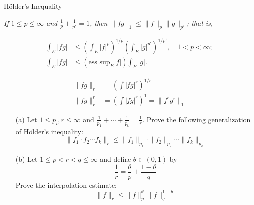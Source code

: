 \documentclass[UTF8,a4paper,10pt]{article}
\begin{document}
\begin{mybox}{H\"older's Inequality}

    \textit{If $1 \leq p \leq \infty$ and $\frac{1}{p} + \frac{1}{p'} = 1$, then $\|fg\|_1 \leq \|f\|_p \|g\|_{p'}$; that is,}

    \begin{equation*}
        \begin{aligned}
          \int_E |fg| &\leq \left( \int_E |f|^p \right)^{1/p} \left( \int_E |g|^{p'} \right)^{1/p'}, \quad 1 < p < \infty; \\
          \int_E |fg| &\leq \left( \text{ess sup}_E |f| \right) \int_E |g|.
        \end{aligned}
      \end{equation*} 
      
    

\end{mybox}


\begin{equation*}
    \begin{aligned}
        \|fg\|_r &= \left( \int |fg|^r \right)^{1/r}\\
        \|f g\|_r^r &= \left( \int |fg|^r \right)^{1} = \|f^r g^r\|_1
    \end{aligned}
  \end{equation*}        


\begin{Problem}[]{}
    \begin{itemize}
        \item[(a)] Let $1 \leq p_i, r \leq \infty$ and $\frac{1}{p_1} + \cdots + \frac{1}{p_k} = \frac{1}{r}$. Prove the following generalization of Hölder’s inequality:
        \[
        \| f_1 \cdot f_2 \cdots f_k \|_r \leq \| f_1 \|_{p_1} \cdot \| f_2 \|_{p_2} \cdots \| f_k \|_{p_k}
        \]
        \item[(b)] Let $1 \leq p < r < q \leq \infty$ and define $\theta \in (0, 1)$ by
        \[
        \frac{1}{r} = \frac{\theta}{p} + \frac{1 - \theta}{q}
        \]
        Prove the interpolation estimate:
        \[
        \| f \|_r \leq \| f \|_p^\theta \| f \|_q^{1-\theta}
        \]
    \end{itemize}
    

\end{Problem}
\end{document}
